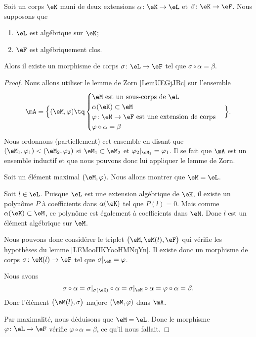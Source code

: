 \begin{lemma} \label{LEMooUULTooYcytat}
	Soit un corps \( \eK\) muni de deux extensions \( \alpha\colon \eK\to \eL\) et \( \beta\colon \eK\to \eF\). Nous supposons que
	\begin{enumerate}
		\item
		      \( \eL\) est algébrique sur \( \eK\);
		\item
		      \( \eF\) est algébriquement clos.
	\end{enumerate}

	Alors il existe un morphisme de corps \( \sigma\colon \eL\to \eF\) tel que \( \sigma\circ \alpha=\beta\).
\end{lemma}

\begin{proof}
	Nous allons utiliser le lemme de Zorn \ref{LemUEGjJBc} sur l'ensemble
	\begin{equation}
		\mA=\Big\{  (\eM,\varphi)  \tq
		\begin{cases}
			\eM\text{ est un sous-corps de } \eL                       \\
			\alpha(\eK)\subset \eM                                     \\
			\varphi\colon \eM\to \eF\text{ est une extension de corps} \\
			\varphi\circ \alpha=\beta
		\end{cases}
		\Big\}.
	\end{equation}
	Nous ordonnons (partiellement) cet ensemble en disant que \( (\eM_1,\varphi_1)<(\eM_2,\varphi_2)\) si \( \eM_1\subset \eM_2\) et \( \varphi_2|_{\eM_1}=\varphi_1\). Il se fait que \( \mA\) est un ensemble inductif et que nous pouvons donc lui appliquer le lemme de Zorn.

	Soit un élément maximal \( (\eM,\varphi)\). Nous allons montrer que \( \eM=\eL\).

	Soit \( l\in \eL\). Puisque \( \eL\) est une extension algébrique de \( \eK\), il existe un polynôme \( P\) à coefficients dans \( \alpha(\eK)\) tel que \( P(l)=0\). Mais comme \( \alpha(\eK)\subset \eM\), ce polynôme est également à coefficients dans \( \eM\). Donc \( l\) est un élément algébrique sur \( \eM\).

	Nous pouvons donc considérer le triplet \( \big( \eM,\eM(l),\eF \big)\) qui vérifie les hypothèses du lemme \ref{LEMooIIKYooHMNqYn}. Il existe donc un morphisme de corps \( \sigma\colon \eM(l)\to \eF\) tel que \( \sigma|_{\eM}=\varphi\).

	Nous avons
	\begin{equation}
		\sigma\circ\alpha=\sigma|_{\sigma(\eK)}\circ \alpha=\sigma|_{\eM}\circ \alpha=\varphi\circ \alpha=\beta.
	\end{equation}
	Donc l'élément \( \big( \eM(l),\sigma \big)\) majore \( (\eM,\varphi)\) dans \( \mA\).

	Par maximalité, nous déduisons que \( \eM=\eL\). Donc le morphisme \( \varphi\colon \eL\to \eF\) vérifie \( \varphi\circ \alpha=\beta\), ce qu'il nous fallait.
\end{proof}

